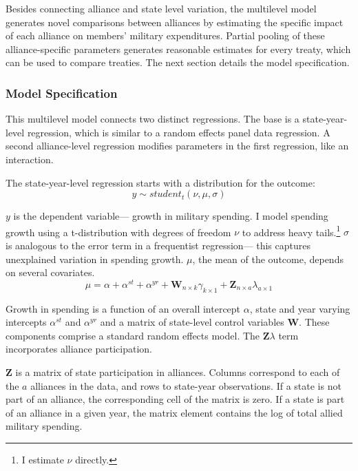 \documentclass[12pt]{article}
\begin{document}
Besides connecting alliance and state level variation, the multilevel model generates novel comparisons between alliances by estimating the specific impact of each alliance on members' military expenditures. 
Partial pooling of these alliance-specific parameters generates reasonable estimates for every treaty, which can be used to compare treaties. 
The next section details the model specification. 
 


\subsubsection{Model Specification} 

This multilevel model connects two distinct regressions. 
The base is a state-year-level regression, which is similar to a random effects panel data regression.
A second alliance-level regression modifies parameters in the first regression, like an interaction. 


The state-year-level regression starts with a distribution for the outcome:
\begin{equation}
y \sim student_t(\nu, \mu, \sigma)
\end{equation}
 

$y$ is the dependent variable--- growth in military spending. 
I model spending growth using a t-distribution with degrees of freedom $\nu$ to address heavy tails.\footnote{I estimate $\nu$ directly.}
$\sigma$ is analogous to the error term in a frequentist regression--- this captures unexplained variation in spending growth.  
$\mu$, the mean of the outcome, depends on several covariates.
\begin{equation}
\mu = \alpha + \alpha^{st} + \alpha^{yr} +\textbf{W}_{n \times k} \gamma_{k \times 1}  + \textbf{Z}_{n \times a} \lambda_{a \times 1} 
\end{equation}


Growth in spending is a function of an overall intercept $\alpha$, state and year varying intercepts $\alpha^{st}$ and $\alpha^{yr}$ and a matrix of state-level control variables $\textbf{W}$.
These components comprise a standard random effects model. 
The $\textbf{Z} \lambda$ term incorporates alliance participation.


$\textbf{Z}$ is a matrix of state participation in alliances. 
Columns correspond to each of the $a$ alliances in the data, and rows to state-year observations. 
If a state is not part of an alliance, the corresponding cell of the matrix is zero.
If a state is part of an alliance in a given year, the matrix element contains the log of total allied military spending.
\end{document}
